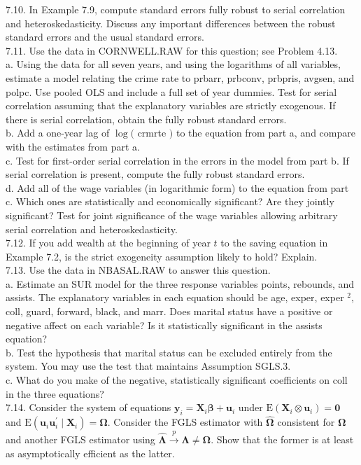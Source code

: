\documentclass[10pt]{article}
\begin{document}
7.10. In Example 7.9, compute standard errors fully robust to serial correlation and heteroskedasticity. Discuss any important differences between the robust standard errors and the usual standard errors.\\
7.11. Use the data in CORNWELL.RAW for this question; see Problem 4.13.\\
a. Using the data for all seven years, and using the logarithms of all variables, estimate a model relating the crime rate to prbarr, prbconv, prbpris, avgsen, and polpc. Use pooled OLS and include a full set of year dummies. Test for serial correlation assuming that the explanatory variables are strictly exogenous. If there is serial correlation, obtain the fully robust standard errors.\\
b. Add a one-year lag of $\log ($ crmrte $)$ to the equation from part a, and compare with the estimates from part a.\\
c. Test for first-order serial correlation in the errors in the model from part b. If serial correlation is present, compute the fully robust standard errors.\\
d. Add all of the wage variables (in logarithmic form) to the equation from part c. Which ones are statistically and economically significant? Are they jointly significant? Test for joint significance of the wage variables allowing arbitrary serial correlation and heteroskedasticity.\\
7.12. If you add wealth at the beginning of year $t$ to the saving equation in Example 7.2, is the strict exogeneity assumption likely to hold? Explain.\\
7.13. Use the data in NBASAL.RAW to answer this question.\\
a. Estimate an SUR model for the three response variables points, rebounds, and assists. The explanatory variables in each equation should be age, exper, exper ${ }^{2}$, coll, guard, forward, black, and marr. Does marital status have a positive or negative affect on each variable? Is it statistically significant in the assists equation?\\
b. Test the hypothesis that marital status can be excluded entirely from the system. You may use the test that maintains Assumption SGLS.3.\\
c. What do you make of the negative, statistically significant coefficients on coll in the three equations?\\
7.14. Consider the system of equations $\mathbf{y}_{i}=\mathbf{X}_{i} \boldsymbol{\beta}+\mathbf{u}_{i}$ under $\mathrm{E}\left(\mathbf{X}_{i} \otimes \mathbf{u}_{i}\right)=\mathbf{0}$ and $\mathrm{E}\left(\mathbf{u}_{i} \mathbf{u}_{i}^{\prime} \mid \mathbf{X}_{i}\right)=\boldsymbol{\Omega}$. Consider the FGLS estimator with $\hat{\boldsymbol{\Omega}}$ consistent for $\boldsymbol{\Omega}$ and another FGLS estimator using $\hat{\boldsymbol{\Lambda}} \xrightarrow{p} \boldsymbol{\Lambda} \neq \boldsymbol{\Omega}$. Show that the former is at least as asymptotically efficient as the latter.\\
\end{document}
